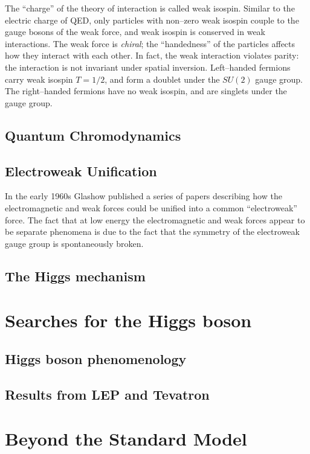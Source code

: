 The ``charge'' of the theory of interaction is called weak isospin.  Similar to
the electric charge of QED, only particles with non--zero weak isospin couple to
the gauge bosons of the weak force, and weak isospin is conserved in weak
interactions.   The weak force is \emph{chiral}; the ``handedness'' of the
particles affects how they interact with each other.  In fact, the weak
interaction violates parity: the interaction is not invariant under spatial
inversion.  Left--handed fermions carry weak isospin $T = 1/2$, and form a
doublet under the $SU(2)$ gauge group.  The right--handed fermions have no weak
isospin, and are singlets under the gauge group.  

\subsection{Quantum Chromodynamics}

\subsection{Electroweak Unification}
In the early 1960s Glashow published a series of papers describing how the
electromagnetic and weak forces could be unified into a common ``electroweak''
force.  The fact that at low energy the electromagnetic and weak forces appear
to be separate phenomena is due to the fact that the symmetry of the electroweak
gauge group is spontaneously broken.

\subsection{The Higgs mechanism}


\section{Searches for the Higgs boson}
\subsection{Higgs boson phenomenology}
\label{sec:SMHiggsPhenom}
\subsection{Results from LEP and Tevatron}

\section{Beyond the Standard Model}
